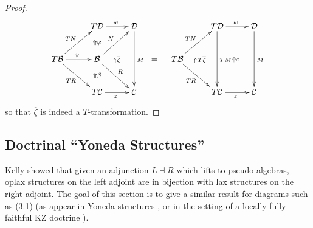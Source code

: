 \documentclass[a4paper,oneside,english]{amsart}
\numberwithin{equation}{section}
\numberwithin{figure}{section}
\theoremstyle{plain}
\theoremstyle{definition}
\theoremstyle{remark}
\theoremstyle{definition}
\theoremstyle{plain}
\theoremstyle{plain}
\theoremstyle{plain}
\begin{document}
\begin{proof}
\[
\xymatrix@=1em{ &  & T\mathcal{D}\ar[rr]^{w}\ar@{}[dd]|-{\Uparrow\varphi} &  & \mathcal{D}\ar[dddd]^{M} &  &  &  & T\mathcal{D}\ar[dddd]^{TM}\ar[rr]^{w} &  & \mathcal{D}\ar[dddd]^{M}\\
\\
T\mathcal{B}\ar[rr]^{y}\ar[rdrd]_{TR}\ar[urur]^{TN} &  & \mathcal{B}\ar[rdrd]^{R}\ar[ruru]^{N}\ar@{}[rr]|-{\Uparrow\overline{\zeta}}\ar@{}[dd]|-{\Uparrow\beta} &  & \; & = & T\mathcal{B}\ar[rdrd]_{TR}\ar[ruru]^{TN}\ar@{}[rr]|-{\Uparrow T\overline{\zeta}} &  & \;\ar@{}[rr]|-{\Uparrow{\varepsilon}} &  & \;\\
\\
 &  & T\mathcal{C}\ar[rr]_{z} &  & \mathcal{C} &  &  &  & T\mathcal{C}\ar[rr]_{z} &  & \mathcal{C}
}
\]
so that $\overline{\zeta}$ is indeed a $T$-transformation.
\end{proof}

\subsection{Doctrinal ``Yoneda Structures''\label{doctrinalyonedastructures}}

Kelly \cite{doctrinal} showed that given an adjunction $L\dashv R$
which lifts to pseudo algebras, oplax structures on the left adjoint
are in bijection with lax structures on the right adjoint. The goal
of this section is to give a similar result for diagrams such as (3.1)
(as appear in Yoneda structures \cite{yonedastructures}, or in the
setting of a locally fully faithful KZ doctrine \cite{yonedakz}). 
\end{document}
